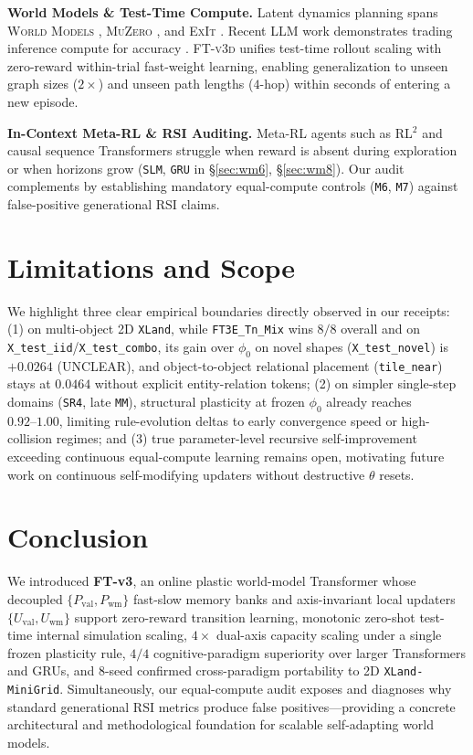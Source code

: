\documentclass[11pt]{article}
\newcommand{\Uval}{U_{\mathrm{val}}}
\newcommand{\Uwm}{U_{\mathrm{wm}}}
\newcommand{\Pval}{P_{\mathrm{val}}}
\newcommand{\Pwm}{P_{\mathrm{wm}}}
\newcommand{\ftd}{\textsc{FT-v3d}}
\begin{document}
\textbf{World Models \& Test-Time Compute.} Latent dynamics planning spans \textsc{World Models} \citep{ha2018world}, \textsc{MuZero} \citep{schrittwieser2020mastering}, and \textsc{ExIt} \citep{anthony2017thinking}. Recent LLM work demonstrates trading inference compute for accuracy \citep{snell2024scaling}. \ftd{} unifies test-time rollout scaling with zero-reward within-trial fast-weight learning, enabling generalization to unseen graph sizes ($2\times$) and unseen path lengths ($4$-hop) within seconds of entering a new episode.

\textbf{In-Context Meta-RL \& RSI Auditing.} Meta-RL agents such as \textsc{RL}$^2$ \citep{duan2016rl2,wang2016learning} and causal sequence Transformers struggle when reward is absent during exploration or when horizons grow (\texttt{SLM}, \texttt{GRU} in \S\ref{sec:wm6}, \S\ref{sec:wm8}). Our audit complements \citet{kirsch2021meta} by establishing mandatory equal-compute controls (\texttt{M6}, \texttt{M7}) against false-positive generational RSI claims.

\section{Limitations and Scope}
\label{sec:limits}

We highlight three clear empirical boundaries directly observed in our receipts: (1) on multi-object 2D \texttt{XLand}, while \texttt{FT3E\_Tn\_Mix} wins $8/8$ overall and on \texttt{X\_test\_iid}/\texttt{X\_test\_combo}, its gain over $\phi_0$ on novel shapes (\texttt{X\_test\_novel}) is $+0.0264$ (\textsc{UNCLEAR}), and object-to-object relational placement (\texttt{tile\_near}) stays at $0.0464$ without explicit entity-relation tokens; (2) on simpler single-step domains (\texttt{SR4}, late \texttt{MM}), structural plasticity at frozen $\phi_0$ already reaches $0.92\text{--}1.00$, limiting rule-evolution deltas to early convergence speed or high-collision regimes; and (3) true parameter-level recursive self-improvement exceeding continuous equal-compute learning remains open, motivating future work on continuous self-modifying updaters without destructive $\theta$ resets.

\section{Conclusion}
\label{sec:conclusion}

We introduced \textbf{FT-v3}, an online plastic world-model Transformer whose decoupled $\{\Pval, \Pwm\}$ fast-slow memory banks and axis-invariant local updaters $\{\Uval, \Uwm\}$ support zero-reward transition learning, monotonic zero-shot test-time internal simulation scaling, $4\times$ dual-axis capacity scaling under a single frozen plasticity rule, $4/4$ cognitive-paradigm superiority over larger Transformers and GRUs, and $8$-seed confirmed cross-paradigm portability to 2D \texttt{XLand-MiniGrid}. Simultaneously, our equal-compute audit exposes and diagnoses why standard generational RSI metrics produce false positives---providing a concrete architectural and methodological foundation for scalable self-adapting world models.
\end{document}
